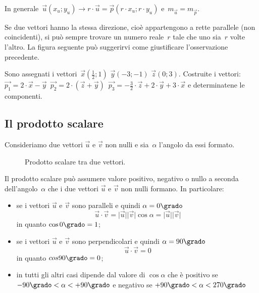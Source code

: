 In generale~$\vec{u}(x_u;y_u) \rightarrow r \cdot \vec{u}=
             \vec{p}(r \cdot x_u; 
             r \cdot y_u)$ e~$m_{\vec{u}}=m_{\vec{p}}$.
   
\begin{osservazione}
Se due vettori hanno la stessa direzione, cioè appartengono a rette parallele 
(non coincidenti), si può sempre trovare un numero reale~$r$
tale che uno sia~$r$ volte l'altro. La figura seguente può suggerirvi come 
giustificare l'osservazione precedente.
\begin{center}
 
\end{center}
\end{osservazione}

\begin{exrig}
\begin{esempio}

Sono assegnati i vettori~$\vec{x}(\frac {1}{2};1)$ $\vec{y}(-3;-1)$ 
$\vec{z}(0;3)$.
Costruite i vettori:~$\vec{p_1}=2 \cdot \vec{x}-\vec{y}$\, $\vec{p_2}=2 \cdot 
(\vec{z}+\vec{y})$\, $\vec{p_3}=-\frac {3}{2} \cdot \vec{z} +2 \cdot \vec{y}+3 
\cdot \vec{x}$
e determinatene le componenti.
\end{esempio}
\end{exrig}

\subsection{Il prodotto scalare}

Consideriamo due vettori $\vec{u}$ e $\vec{v}$ non nulli e 
sia~$\alpha$ l'angolo da essi formato.

\begin{inaccessibleblock}
 \begin{figure}[t]
 \centering
  
 \caption{Prodotto scalare tra due vettori.}
 \label{fig:vett_prodotto_scalare}
\end{figure}
\end{inaccessibleblock}
                  
Il prodotto scalare può assumere valore positivo, negativo o nullo a seconda 
dell'angolo~$\alpha$ che i due vettori $\vec{u}$ e $\vec{v}$ non nulli formano. 
In particolare:
\begin{itemize}
 \item se i vettori $\vec{u}$ e $\vec{v}$ sono paralleli e 
  quindi $\alpha=0\grado$
  \[\vec{u} \cdot \vec{v} = \lvert\vec{u}\rvert\lvert\vec{v}\rvert \cos \alpha=
    \lvert\vec{u}\rvert\lvert\vec{v}\rvert\] 
  in quanto $\cos 0\grado = 1$;
 \item se i vettori $\vec{u}$ e $\vec{v}$ sono perpendicolari e 
  quindi $\alpha=90\grado$
  \[\vec{u} \cdot \vec{v} = 0\] 
  in quanto $cos 90\grado = 0$;
 \item in tutti gli altri casi dipende dal valore di $\cos \alpha$ che è 
  positivo se $-90\grado < \alpha < +90\grado$ e negativo 
  se $+90\grado < \alpha < 270\grado$
\end{itemize}

